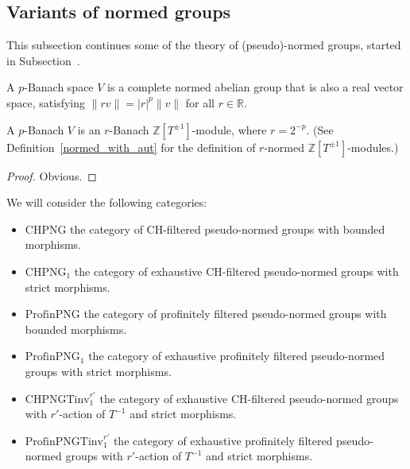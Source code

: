 \subsection{Variants of normed groups}
\label{sec:normed_groups2}

This subsection continues some of the theory of (pseudo)-normed groups,
started in Subsection~\label{sec:normed_groups}.

\begin{definition}
  \label{p-banach}
  \leanok
  A $p$-Banach space $V$ is a complete normed abelian group
  that is also a real vector space,
  satisfying $\|rv\| = |r|^p\|v\|$ for all $r \in \mathbb R$.
\end{definition}

\begin{lemma}
  \label{p-banach-r-normed}
   A $p$-Banach $V$ is an $r$-Banach $\mathbb Z[T^{\pm 1}]$-module, where $r=2^{-p}$.
   (See Definition~\ref{normed_with_aut} for the definition of $r$-normed $\mathbb Z[T^{\pm 1}]$-modules.)
\end{lemma}

\begin{proof}
  Obvious.
\end{proof}

\begin{definition}
  \label{png-cats}
  We will consider the following categories:
  \begin{itemize}
    \item $\text{CHPNG}$ the category of CH-filtered pseudo-normed groups with bounded morphisms.
    \item $\text{CHPNG}_1$ the category of exhaustive CH-filtered pseudo-normed groups with strict morphisms.
    \item $\text{ProfinPNG}$ the category of profinitely filtered pseudo-normed groups with bounded morphisms.
    \item $\text{ProfinPNG}_1$ the category of exhaustive profinitely filtered pseudo-normed groups with strict morphisms.
    \item $\text{CHPNGTinv}_1^{r'}$ the category of exhaustive CH-filtered pseudo-normed groups with $r'$-action of $T^{-1}$ and strict morphisms.
    \item $\text{ProfinPNGTinv}_1^{r'}$ the category of exhaustive profinitely filtered pseudo-normed groups with $r'$-action of $T^{-1}$ and strict morphisms.
  \end{itemize}
\end{definition}

